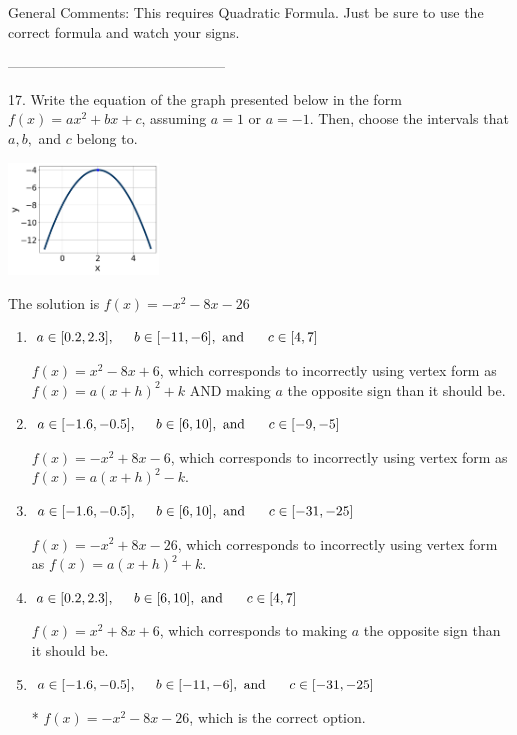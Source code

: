 \documentclass{article}[14pt]
\begin{document}
General Comments: This requires Quadratic Formula. Just be sure to use the correct formula and watch your signs.

-----------------------------------------------

17. Write the equation of the graph presented below in the form $f(x)=ax^2+bx+c$, assuming  $a=1$ or $a=-1$. Then, choose the intervals that $a, b,$ and $c$ belong to.
\begin{center} \includegraphics[width=0.3\textwidth]{../Figures/quadraticGraphToEquationA.png} \end{center} 

The solution is $ f(x) = -x^{2} -8 x -26 $ 

\begin{enumerate}[label=\Alph*.] 
\item $ a \in [0.2, 2.3], \hspace*{5mm} b \in [-11, -6], \text{ and } \hspace*{5mm} c \in [4, 7] $ 

 $f(x)=x^{2} -8 x + 6$, which corresponds to incorrectly using vertex form as $f(x) = a(x+h)^2+k$ AND making $a$ the opposite sign than it should be. 
\item $ a \in [-1.6, -0.5], \hspace*{5mm} b \in [6, 10], \text{ and } \hspace*{5mm} c \in [-9, -5] $ 

 $f(x)=-x^{2} +8 x -6$, which corresponds to incorrectly using vertex form as $f(x) = a(x+h)^2 - k$. 
\item $ a \in [-1.6, -0.5], \hspace*{5mm} b \in [6, 10], \text{ and } \hspace*{5mm} c \in [-31, -25] $ 

 $f(x)=-x^{2} +8 x -26$, which corresponds to incorrectly using vertex form as $f(x) = a(x+h)^2+k$. 
\item $ a \in [0.2, 2.3], \hspace*{5mm} b \in [6, 10], \text{ and } \hspace*{5mm} c \in [4, 7] $ 

 $f(x)=x^{2} +8 x + 6$, which corresponds to making $a$ the opposite sign than it should be. 
\item $ a \in [-1.6, -0.5], \hspace*{5mm} b \in [-11, -6], \text{ and } \hspace*{5mm} c \in [-31, -25] $ 

 * $f(x)=-x^{2} -8 x -26$, which is the correct option. 
\end{enumerate} 
 
\end{document}
